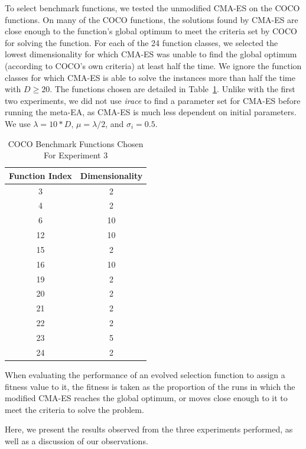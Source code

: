 \documentclass[times,12pt,titlepage]{mstogs}
\begin{document}
\begin{ThesisBody}
To select benchmark functions, we tested the unmodified CMA-ES on the COCO functions. On many of the COCO functions, the solutions found by CMA-ES are close enough to the function's global optimum to meet the criteria set by COCO for solving the function. For each of the 24 function classes, we selected the lowest dimensionality for which CMA-ES was unable to find the global optimum (according to COCO's own criteria) at least half the time. We ignore the function classes for which CMA-ES is able to solve the instances more than half the time with $D\geq20$. The functions chosen are detailed in Table~\ref{tab:experiment3chosenFunctions}. Unlike with the first two experiments, we did not use \textit{irace} to find a parameter set for CMA-ES before running the meta-EA, as CMA-ES is much less dependent on initial parameters. We use $\lambda=10*D$, $\mu = \lambda/2$, and $\sigma_i = 0.5$. 

\begin{table}[htb]
\centering
  \caption{COCO Benchmark Functions Chosen For Experiment 3}
  \label{tab:experiment3chosenFunctions}
  \begin{tabular}{c|c}
    \toprule
    Function Index & Dimensionality \\
    \midrule
    3 & 2\\
    \hline
    4& 2\\
    \hline
    6& 10\\
    \hline
    12& 10\\
    \hline
    15& 2\\
    \hline
    16& 10\\
    \hline
    19& 2\\
    \hline
    20& 2\\
    \hline
    21& 2\\
    \hline
    22& 2\\
    \hline
    23& 5\\
    \hline
    24& 2\\                        
	
  \bottomrule
\end{tabular}
\end{table}

When evaluating the performance of an evolved selection function to assign a fitness value to it, the fitness is taken as the proportion of the runs in which the modified CMA-ES reaches the global optimum, or moves close enough to it to meet the criteria to solve the problem.

\label{Results}
Here, we present the results observed from the three experiments performed, as well as a discussion of our observations.


\end{ThesisBody}
\end{document}
